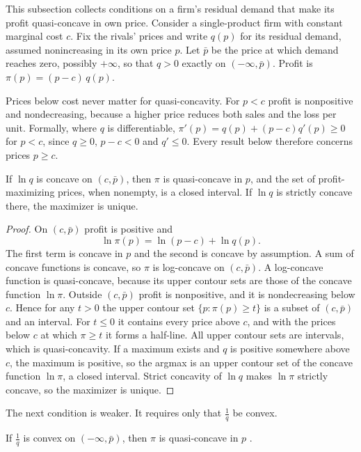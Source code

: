 This subsection collects conditions on a firm's residual demand that make its profit quasi-concave in own price.
Consider a single-product firm with constant marginal cost $c$. Fix the rivals' prices and write $q(p)$ for its
residual demand, assumed nonincreasing in its own price $p$. Let $\bar p$ be the price at which demand reaches
zero, possibly $+\infty$, so that $q > 0$ exactly on $(-\infty, \bar p)$. Profit is $\pi(p) = (p - c)\,q(p)$.

Prices below cost never matter for quasi-concavity. For $p < c$ profit is nonpositive and nondecreasing,
because a higher price reduces both sales and the loss per unit. Formally, where $q$ is differentiable,
$\pi'(p) = q(p) + (p - c)q'(p) \ge 0$ for $p < c$, since $q \ge 0$, $p - c < 0$ and $q' \le 0$. Every result
below therefore concerns prices $p \ge c$.

\begin{lemma}\label{lem:04-logconcave}
If $\ln q$ is concave on $(c, \bar p)$, then $\pi$ is quasi-concave in $p$, and the set of profit-maximizing
prices, when nonempty, is a closed interval. If $\ln q$ is strictly concave there, the maximizer is unique.
\end{lemma}

\begin{proof}
On $(c, \bar p)$ profit is positive and
\[
  \ln \pi(p) = \ln(p - c) + \ln q(p).
\]
The first term is concave in $p$ and the second is concave by assumption. A sum of concave functions is
concave, so $\pi$ is log-concave on $(c, \bar p)$. A log-concave function is quasi-concave, because its upper
contour sets are those of the concave function $\ln\pi$. Outside $(c, \bar p)$ profit is nonpositive, and it is
nondecreasing below $c$. Hence for any $t > 0$ the upper contour set $\{p : \pi(p) \ge t\}$ is a subset of
$(c, \bar p)$ and an interval. For $t \le 0$ it contains every price above $c$, and with the prices below $c$ at
which $\pi \ge t$ it forms a half-line. All upper contour sets are intervals, which is quasi-concavity. If a maximum exists
and $q$ is positive somewhere above $c$, the maximum is positive, so the argmax is an upper contour set of the concave function
$\ln\pi$, a closed interval. Strict concavity of $\ln q$ makes $\ln\pi$ strictly concave, so the maximizer is
unique.
\end{proof}

The next condition is weaker. It requires only that $\frac{1}{q}$ be convex.

\begin{lemma}\label{lem:04-recip}
If $\frac{1}{q}$ is convex on $(-\infty, \bar p)$, then $\pi$ is quasi-concave in $p$
\citep[Proposition 3]{CaplinNalebuff1991}.
\end{lemma}

